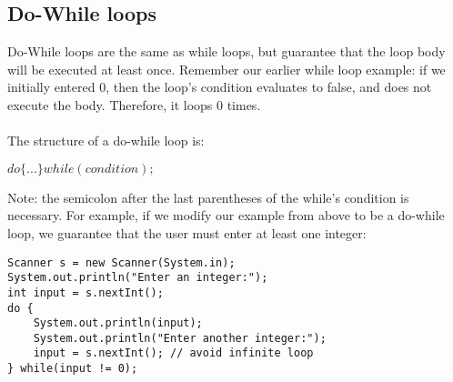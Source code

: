 \subsection{Do-While loops}
Do-While loops are the same as while loops, but guarantee that the loop body will be executed at least once. Remember our earlier while loop example: if we initially entered 0, then the loop's condition evaluates to false, and does not execute the body. Therefore, it loops 0 times. 
\\ \\
The structure of a do-while loop is:
\begin{center}
$do \{ ... \} while(condition);$
\end{center}
Note: the semicolon after the last parentheses of the while's condition is necessary. For example, if we modify our example from above to be a do-while loop, we guarantee that the user must enter at least one integer:
\begin{lstlisting}
Scanner s = new Scanner(System.in);
System.out.println("Enter an integer:");
int input = s.nextInt();
do {
	System.out.println(input);
	System.out.println("Enter another integer:");
	input = s.nextInt(); // avoid infinite loop
} while(input != 0);
\end{lstlisting}

